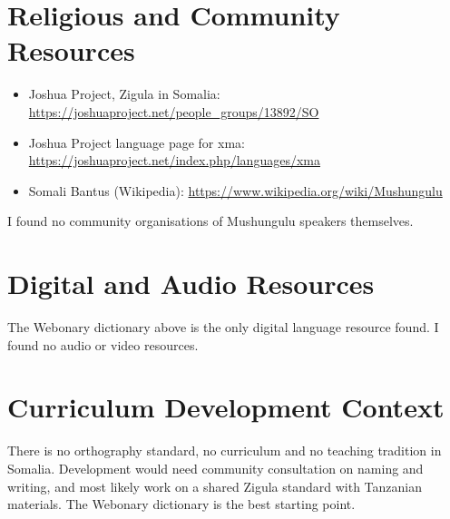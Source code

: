 \documentclass[12pt]{article}
\begin{document}
\section{Religious and Community Resources}
\begin{itemize}
\item Joshua Project, Zigula in Somalia: \url{https://joshuaproject.net/people_groups/13892/SO}
\item Joshua Project language page for xma: \url{https://joshuaproject.net/index.php/languages/xma}
\item Somali Bantus (Wikipedia): \url{https://www.wikipedia.org/wiki/Mushungulu}
\end{itemize}
I found no community organisations of Mushungulu speakers themselves.

\section{Digital and Audio Resources}
The Webonary dictionary above is the only digital language resource found. I found no audio or video resources.

\section{Curriculum Development Context}
There is no orthography standard, no curriculum and no teaching tradition in Somalia. Development would need community consultation on naming and writing, and most likely work on a shared Zigula standard with Tanzanian materials. The Webonary dictionary is the best starting point.
\end{document}
